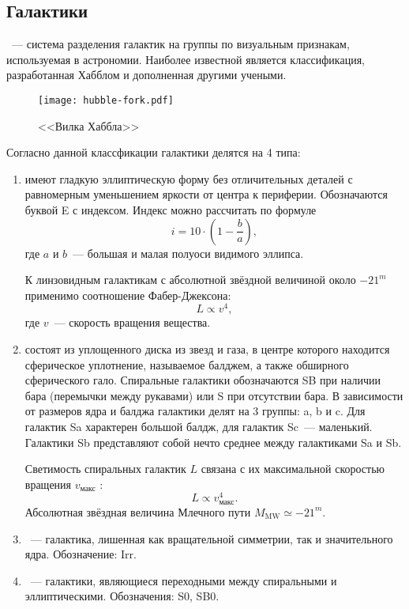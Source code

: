 \subsection{Галактики}
~--- система разделения галактик на группы по визуальным признакам, используемая в астрономии. Наиболее известной является классификация, разработанная Хабблом и дополненная другими учеными. 
	\begin{figure}[h!]
		\centering
		\vspace{-.9pc}
		\texttt{[image: hubble-fork.pdf]}
		\caption{<<Вилка Хаббла>>}
	\end{figure}
	
Согласно данной классфикации галактики делятся на 4 типа:
\begin{enumerate}[itemsep=3pt, label={\arabic*.}, leftmargin=1pc]
	\item{ имеют гладкую эллиптическую форму без отличительных деталей с равномерным уменьшением яркости от центра к периферии. Обозначаются буквой E с индексом. Индекс можно рассчитать по формуле
		\begin{equation}
		i = 10 \cdot \left(1 - \frac{b}{a}\right),
		\end{equation}\nopagebreak
		где $a$ и $b$~--- большая и малая полуоси видимого эллипса. 
		
		К линзовидным галактикам с абсолютной звёздной величиной около $-21^m$ применимо соотношение Фабер-Джексона:
		\begin{equation}
			L \propto v^4,
		\end{equation}
		где $v$~--- скорость вращения вещества.}
	\item{ состоят из уплощенного диска из звезд и газа, в центре которого находится сферическое уплотнение, называемое балджем, а также обширного сферического гало. Спиральные галактики обозначаются SB при наличии бара (перемычки между рукавами) или S при отсутствии бара. В зависимости от размеров ядра и балджа галактики делят на 3 группы: a, b и c. Для галактик Sa характерен большой балдж, для галактик Sc~--- маленький. Галактики Sb представляют собой нечто среднее между галактиками Sa и Sb.
	
	Светимость спиральных галактик $L$ связана с их максимальной скоростью вращения $v_\text{макс}$ :
	\begin{equation}
		L \propto v_\text{макс}^4.
	\end{equation}
	Абсолютная звёздная величина Млечного пути $M_\text{MW} \simeq -21^m$.}
	\item{~--- галактика, лишенная как вращательной симметрии, так и значительного ядра. Обозначение: Irr.}
	\item{~--- галактики, являющиеся переходными между спиральными и эллиптическими. Обозначения: S0, SB0.}
\end{enumerate}

